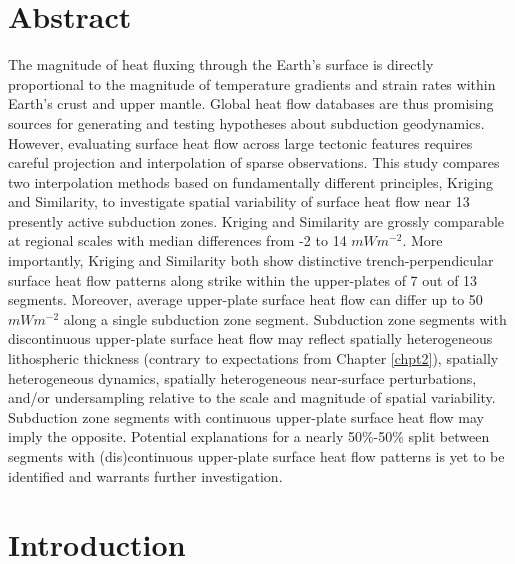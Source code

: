 
\hypertarget{chpt3Abstract}{%
\section{Abstract}\label{chpt3Abstract}}

The magnitude of heat fluxing through the Earth's surface is directly proportional to the magnitude of temperature gradients and strain rates within Earth's crust and upper mantle. Global heat flow databases are thus promising sources for generating and testing hypotheses about subduction geodynamics. However, evaluating surface heat flow across large tectonic features requires careful projection and interpolation of sparse observations. This study compares two interpolation methods based on fundamentally different principles, Kriging and Similarity, to investigate spatial variability of surface heat flow near 13 presently active subduction zones. Kriging and Similarity are grossly comparable at regional scales with median differences from -2 to 14 \(mWm^{-2}\). More importantly, Kriging and Similarity both show distinctive trench-perpendicular surface heat flow patterns along strike within the upper-plates of 7 out of 13 segments. Moreover, average upper-plate surface heat flow can differ up to 50 \(mWm^{-2}\) along a single subduction zone segment. Subduction zone segments with discontinuous upper-plate surface heat flow may reflect spatially heterogeneous lithospheric thickness (contrary to expectations from Chapter \ref{chpt2}), spatially heterogeneous dynamics, spatially heterogeneous near-surface perturbations, and/or undersampling relative to the scale and magnitude of spatial variability. Subduction zone segments with continuous upper-plate surface heat flow may imply the opposite. Potential explanations for a nearly 50\%-50\% split between segments with (dis)continuous upper-plate surface heat flow patterns is yet to be identified and warrants further investigation.

\hypertarget{chpt3Intro}{%
\section{Introduction}\label{chpt3Intro}}


